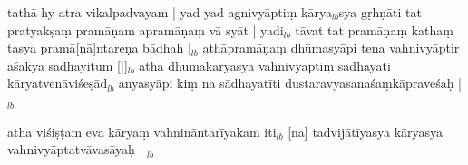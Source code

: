 \documentclass[article,12pt,a4paper]{memoir}%
\newcounter{parCount}
\begin{document}
	  
	  \pstart \leavevmode%
	tathā hy atra vikalpadvayam | yad yad agnivyāptiṃ kārya{\tiny $_{lb}$}sya gṛhṇāti tat pratyakṣaṃ pramāṇam apramāṇaṃ vā syāt | yadi{\tiny $_{lb}$} tāvat tat pramāṇaṃ kathaṃ tasya pramā[ṇā]ntareṇa bādhaḥ |{\tiny $_{lb}$} athāpramāṇaṃ dhūmasyāpi tena vahnivyāptir aśakyā sādhayitum [|]{\tiny $_{lb}$} atha dhūmakāryasya vahnivyāptiṃ sādhayati kāryatvenāviśeṣād{\tiny $_{lb}$} anyasyāpi kiṃ na sādhayatīti dustaravyasanaśaṃkāpraveśaḥ |
	{}
	\pend%
      {\tiny $_{lb}$}

	  
	  \pstart \leavevmode%
	\leavevmode{} atha viśiṣṭam eva kāryaṃ vahnināntarīyakam iti{\tiny $_{lb}$} [na] tadvijātīyasya kāryasya vahnivyāptatvāvasāyaḥ |
	{}
	\pend%
      {\tiny $_{lb}$}
\end{document}
